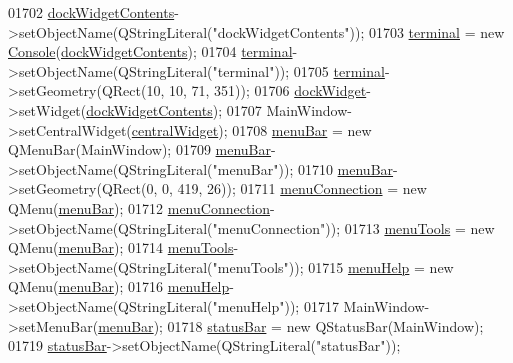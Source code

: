 \begin{DoxyCode}
01702         \hyperlink{a00027_a765ded8236736213d556f6f91941808e}{dockWidgetContents}->setObjectName(QStringLiteral(\textcolor{stringliteral}{"dockWidgetContents"}));
01703         \hyperlink{a00027_aae71c46ea4546df5994735dee573b2dd}{terminal} = \textcolor{keyword}{new} \hyperlink{a00002}{Console}(\hyperlink{a00027_a765ded8236736213d556f6f91941808e}{dockWidgetContents});
01704         \hyperlink{a00027_aae71c46ea4546df5994735dee573b2dd}{terminal}->setObjectName(QStringLiteral(\textcolor{stringliteral}{"terminal"}));
01705         \hyperlink{a00027_aae71c46ea4546df5994735dee573b2dd}{terminal}->setGeometry(QRect(10, 10, 71, 351));
01706         \hyperlink{a00027_ac8a083c4b66fb317a9b538409ce412e2}{dockWidget}->setWidget(\hyperlink{a00027_a765ded8236736213d556f6f91941808e}{dockWidgetContents});
01707         MainWindow->setCentralWidget(\hyperlink{a00027_a30075506c2116c3ed4ff25e07ae75f81}{centralWidget});
01708         \hyperlink{a00027_a2be1c24ec9adfca18e1dcc951931457f}{menuBar} = \textcolor{keyword}{new} QMenuBar(MainWindow);
01709         \hyperlink{a00027_a2be1c24ec9adfca18e1dcc951931457f}{menuBar}->setObjectName(QStringLiteral(\textcolor{stringliteral}{"menuBar"}));
01710         \hyperlink{a00027_a2be1c24ec9adfca18e1dcc951931457f}{menuBar}->setGeometry(QRect(0, 0, 419, 26));
01711         \hyperlink{a00027_a08372e1c0820afb98e2cdf98d1738036}{menuConnection} = \textcolor{keyword}{new} QMenu(\hyperlink{a00027_a2be1c24ec9adfca18e1dcc951931457f}{menuBar});
01712         \hyperlink{a00027_a08372e1c0820afb98e2cdf98d1738036}{menuConnection}->setObjectName(QStringLiteral(\textcolor{stringliteral}{"menuConnection"}));
01713         \hyperlink{a00027_a552c7b6d729252c2768c9a077679fef7}{menuTools} = \textcolor{keyword}{new} QMenu(\hyperlink{a00027_a2be1c24ec9adfca18e1dcc951931457f}{menuBar});
01714         \hyperlink{a00027_a552c7b6d729252c2768c9a077679fef7}{menuTools}->setObjectName(QStringLiteral(\textcolor{stringliteral}{"menuTools"}));
01715         \hyperlink{a00027_ab95dbfbb0550206aeac76db36f491548}{menuHelp} = \textcolor{keyword}{new} QMenu(\hyperlink{a00027_a2be1c24ec9adfca18e1dcc951931457f}{menuBar});
01716         \hyperlink{a00027_ab95dbfbb0550206aeac76db36f491548}{menuHelp}->setObjectName(QStringLiteral(\textcolor{stringliteral}{"menuHelp"}));
01717         MainWindow->setMenuBar(\hyperlink{a00027_a2be1c24ec9adfca18e1dcc951931457f}{menuBar});
01718         \hyperlink{a00027_a50fa481337604bcc8bf68de18ab16ecd}{statusBar} = \textcolor{keyword}{new} QStatusBar(MainWindow);
01719         \hyperlink{a00027_a50fa481337604bcc8bf68de18ab16ecd}{statusBar}->setObjectName(QStringLiteral(\textcolor{stringliteral}{"statusBar"}));

\end{DoxyCode}
